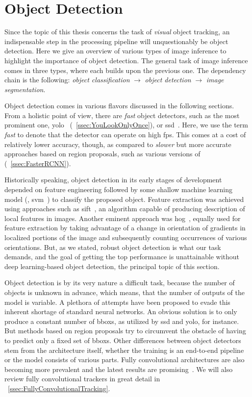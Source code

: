 \section{Object Detection}
\label{sec:ObjectDetection}

Since the topic of this thesis concerns the task of \emph{visual} object tracking, an indispensable step in the processing pipeline will unquestionably be object detection. Here we give an overview of various types of image inference to highlight the importance of object detection. The general task of image inference comes in three types, where each builds upon the previous one. The dependency chain is the following: \emph{object classification} $\to$ \emph{object detection} $\to$ \emph{image segmentation}.

Object detection comes in various flavors discussed in the following sections. From a holistic point of view, there are \emph{fast} object detectors, such as the most prominent one, \gls{yolo}~\cite{redmon2016yolo} (\sectiontext{}~\ref{ssec:YouLookOnlyOnce}), or \gls{ssd}~\cite{liu2016ssd}. Here, we use the term \emph{fast} to denote that the detector can operate on high \gls{fps}. This comes at a cost of relatively lower accuracy, though, as compared to \emph{slower} but more accurate approaches based on region proposals, such as various versions of \fasterrcnn{} (\sectiontext{}~\ref{ssec:FasterRCNN}).

Historically speaking, object detection in its early stages of development depended on feature engineering followed by some shallow machine learning model (\egtext{}, \gls{svm}~\cite{cortes1995support}) to classify the proposed object. Feature extraction was achieved using approaches such as \gls{sift}~\cite{lowel1999objrecognition}, an algorithm capable of producing description of local features in images. Another eminent approach was \gls{hog}~\cite{mcconnell1986osti}, equally used for feature extraction by taking advantage of a change in orientation of gradients in localized portions of the image and subsequently counting occurrences of various orientations. But, as we stated, robust object detection is what our task demands, and the goal of getting the top performance is unattainable without deep learning-based object detection, the principal topic of this section.

Object detection is by its very nature a difficult task, because the number of objects is unknown in advance, which means, that the number of outputs of the model is variable. A plethora of attempts have been proposed to evade this inherent shortage of standard neural networks. An obvious solution is to only produce a constant number of \glspl{bbox}, as utilized by \gls{ssd} and \gls{yolo}, for instance. But methods based on region proposals try to circumvent the obstacle of having to predict only a fixed set of \glspl{bbox}. Other differences between object detectors stem from the architecture itself, whether the training is an end-to-end pipeline or the model consists of various parts. Fully convolutional architectures are also becoming more prevalent and the latest results are promising~\cite{tian2019fcos}. We will also review fully convolutional trackers in great detail in \sectiontext{}~\ref{ssec:FullyConvolutionalTracking}.

